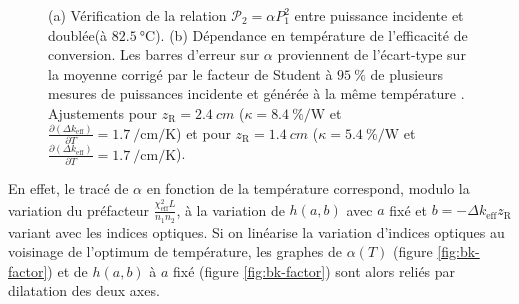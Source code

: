 \documentclass[11pt,a4paper]{article}
\newcommand{\pdv}[2]{\frac{\partial #1}{\partial #2}}
\newcommand{\zr}{z_\mathsc{R}}
\newcommand{\chie}{\chi_\mathsc{eff}}
\newcommand{\dke}{\Delta k_\mathsc{eff}}
\renewcommand{\P}{\mathscr{P}}
\newcommand{\mathsc}[1]{\mathrm{\scriptscriptstyle {#1}}}
\begin{document}
\begin{figure}[htpb]
\centering
\hspace*{-0.4cm}\begin{subfigure}[b]{0.45\textwidth}
    \centering
    \small
    
    	\vspace{-1cm}
    \caption{}
    \label{fig:quadra}
\end{subfigure}
%
\hspace*{0.4cm}
\begin{subfigure}[b]{0.48\textwidth}
	\centering
	\small
	
	\vspace{-1cm}
	\caption{}
	\label{fig:alphabp}
\end{subfigure}
\caption[(a) Vérification de la relation $\P_2 = \alpha P_1^2$ entre puissance incidente et doublée (à $\SI{82.5}{\celsius}$). (b) Dépendance en température de l'efficacité de conversion.]{\small (a) Vérification de la relation $\P_2 = \alpha P_1^2$ entre puissance incidente et doublée\footnotemark (à $\SI{82.5}{\celsius}$).
(b) Dépendance en température de l'efficacité de conversion. Les barres d'erreur sur $\alpha$ proviennent de l'écart-type sur la moyenne corrigé par le facteur de Student à $\SI{95}{\percent}$ de plusieurs mesures de puissances incidente et générée à la même température \footnotemark .
Ajustements pour $\zr=\SI{2.4}{cm}$ ($\kappa=\SI{8.4}{\percent\per\watt}$ et $\pdv{\left(\dke\right)}{T}=\SI{1.7}{\per\centi\meter\per\kelvin}$) et pour $\zr=\SI{1.4}{cm}$ ($\kappa=\SI{5.4}{\percent\per\watt}$ et $\pdv{\left(\dke\right)}{T}=\SI{1.7}{\per\centi\meter\per\kelvin}$).
}
\end{figure}

En effet, le tracé de $\alpha$ en fonction de la température correspond, modulo la variation du préfacteur $\frac{\chie^2 L}{n_1 n_2}$, à la variation de $h(a,b)$ avec $a$ fixé et $b=-\Delta k_\mathsc{eff} \zr$ variant avec les indices optiques. Si on linéarise la variation d'indices optiques au voisinage de l'optimum de température, les graphes de $\alpha(T)$ (figure \ref{fig:bk-factor}) et de $h(a,b)$ à $a$ fixé (figure \ref{fig:bk-factor}) sont alors reliés par dilatation des deux axes.
\end{document}
